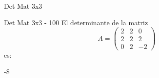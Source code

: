 \documentclass[a4,11pt]{aleph-notas}
\begin{document}
\begin{quiz}{Det Mat 3x3}
\begin{numerical}[tolerance=0]%
    {Det Mat 3x3 - 100}
    El determinante de la matriz
    \[
        A = \begin{pmatrix} 2 & 2 & 0 \\ 2 & 2 & 2 \\ 0 & 2 & -2 \end{pmatrix}
    \]
    es:
    \item[] -8
\end{numerical}




\end{quiz}
\end{document}
